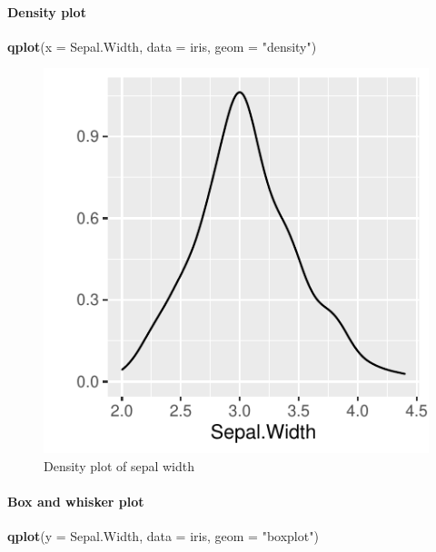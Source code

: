 \documentclass[]{article}
\newenvironment{Shaded}{\begin{snugshade}}{\end{snugshade}}
\newcommand{\DataTypeTok}[1]{\textcolor[rgb]{0.13,0.29,0.53}{#1}}
\newcommand{\KeywordTok}[1]{\textcolor[rgb]{0.13,0.29,0.53}{\textbf{#1}}}
\newcommand{\NormalTok}[1]{#1}
\newcommand{\StringTok}[1]{\textcolor[rgb]{0.31,0.60,0.02}{#1}}
\let\oldparagraph\paragraph
\renewcommand{\paragraph}[1]{\oldparagraph{#1}\mbox{}}
\begin{document}
\hypertarget{density-plot}{%
\paragraph{Density plot}\label{density-plot}}

\begin{Shaded}
\begin{Highlighting}[]
\KeywordTok{qplot}\NormalTok{(}\DataTypeTok{x =}\NormalTok{ Sepal.Width, }\DataTypeTok{data =}\NormalTok{ iris, }\DataTypeTok{geom =} \StringTok{"density"}\NormalTok{)}
\end{Highlighting}
\end{Shaded}

\begin{figure}
\centering
\includegraphics{Week3Answers_files/figure-latex/unnamed-chunk-6-1.pdf}
\caption{Density plot of sepal width}
\end{figure}

\newpage

\hypertarget{box-and-whisker-plot}{%
\paragraph{Box and whisker plot}\label{box-and-whisker-plot}}

\begin{Shaded}
\begin{Highlighting}[]
\KeywordTok{qplot}\NormalTok{(}\DataTypeTok{y =}\NormalTok{ Sepal.Width, }\DataTypeTok{data =}\NormalTok{ iris, }\DataTypeTok{geom =} \StringTok{"boxplot"}\NormalTok{)}
\end{Highlighting}
\end{Shaded}
\end{document}
